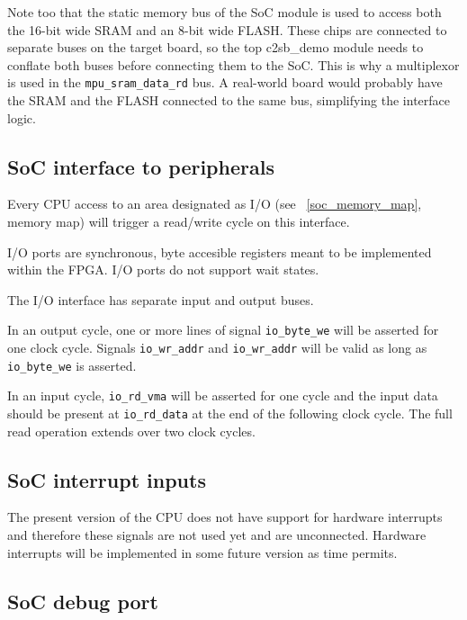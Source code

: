Note too that the static memory bus of the SoC module is used to access both the 16-bit wide SRAM 
and an 8-bit wide FLASH. These chips are connected to separate buses on the 
target board, so the top c2sb\_demo module needs to conflate both buses before connecting 
them to the SoC. This is why a multiplexor is used in the \texttt{mpu\_sram\_data\_rd}
bus. A real-world board would probably have the SRAM and the FLASH connected 
to the same bus, simplifying the interface logic.
   
    
\subsection{SoC interface to peripherals}
\label{soc_if_io}

    Every CPU access to an area designated as I/O (see ~\ref{soc_memory_map}, memory map)
    will trigger a read/write cycle on this interface.
    
    I/O ports are synchronous, byte accesible registers meant to be implemented
    within the FPGA. I/O ports do not support wait states.
    
    The I/O interface has separate input and output buses. 
    
    In an output cycle, one or more lines of signal \texttt{io\_byte\_we} will be
    asserted for one clock cycle. Signals \texttt{io\_wr\_addr} and \texttt{io\_wr\_addr} will
    be valid as long as \texttt{io\_byte\_we} is asserted.

    In an input cycle, \texttt{io\_rd\_vma} will be asserted for one cycle and the input
    data should be present at \texttt{io\_rd\_data} at the end of the following clock 
    cycle. The full read operation extends over two clock cycles.
    
\subsection{SoC interrupt inputs}
\label{soc_irqs}
    
    The present version of the CPU does not have support for hardware interrupts 
    and therefore these signals are not used yet and are unconnected. 
    Hardware interrupts will be implemented in some future version as 
    time permits.

\subsection{SoC debug port}
\label{soc_debug_port}
    
